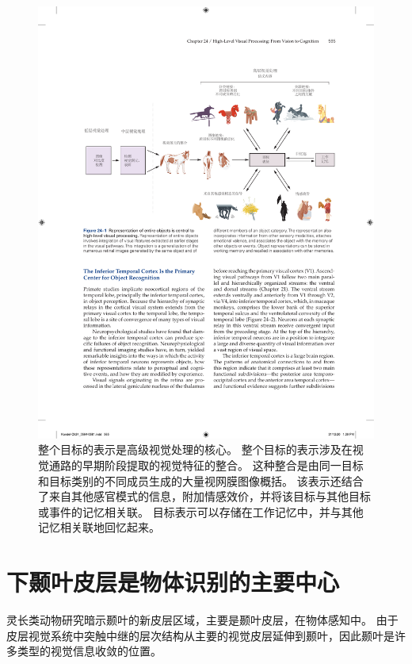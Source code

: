 \begin{figure}[htbp]
	\centering
	\includegraphics[width=1.0\linewidth]{chap24/fig_24_1}
	\caption{整个目标的表示是高级视觉处理的核心。
		整个目标的表示涉及在视觉通路的早期阶段提取的视觉特征的整合。
		这种整合是由同一目标和目标类别的不同成员生成的大量视网膜图像概括。
		该表示还结合了来自其他感官模式的信息，附加情感效价，并将该目标与其他目标或事件的记忆相关联。
		目标表示可以存储在工作记忆中，并与其他记忆相关联地回忆起来。}
	\label{fig:24_1}
\end{figure}



\section{下颞叶皮层是物体识别的主要中心}

灵长类动物研究暗示颞叶的新皮层区域，主要是颞叶皮层，在物体感知中。
由于皮层视觉系统中突触中继的层次结构从主要的视觉皮层延伸到颞叶，因此颞叶是许多类型的视觉信息收敛的位置。


